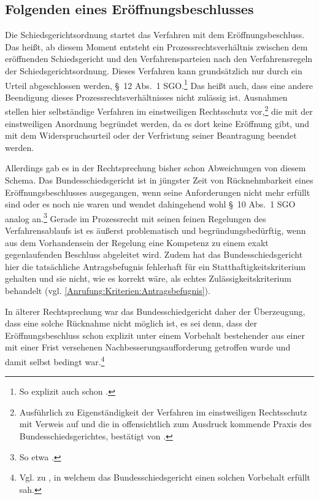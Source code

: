 \subsection{Folgenden eines Eröffnungsbeschlusses}
\label{Anrufung:Beschluss:EroeffnungFolgen}
Die Schiedsgerichtsordnung startet das Verfahren mit dem Eröffnungsbeschluss.
Das heißt, ab diesem Moment entsteht ein Prozessrechtsverhältnis zwischen dem eröffnenden Schiedsgericht und den Verfahrensparteien nach den Verfahrensregeln der Schiedsgerichtsordnung.
Dieses Verfahren kann grundsätzlich nur durch ein Urteil abgeschlossen werden, \S~12 Abs.~1 SGO.\footnote{So explizit auch schon \cite[S.~2]{BSG20131204}.}
Das heißt auch, dass eine andere Beendigung dieses Prozessrechtsverhältnisses nicht zulässig ist.
Ausnahmen stellen hier selbständige Verfahren im einstweiligen Rechtsschutz vor,\footnote{Ausführlich zu Eigenständigkeit der Verfahren im einstweiligen Rechtsschutz \cite[S.~3]{LSGBB145} mit Verweis auf \cites[S.~4]{LSGHE20140423II} und die in \cites{BSG41114ES}{BSG3314EA} offensichtlich zum Ausdruck kommende Praxis des Bundesschiedsgerichtes, bestätigt von \cite[S.~2~f.]{BSG4214ESWiderspruch}.} die mit der einstweiligen Anordnung begründet werden, da es dort keine Eröffnung gibt, und mit dem Widerspruchsurteil oder der Verfristung seiner Beantragung beendet werden.

Allerdings gab es in der Rechtsprechung bisher schon Abweichungen von diesem Schema.
Das Bundesschiedsgericht ist in jüngster Zeit von Rücknehmbarkeit eines Eröffnungsbeschlusses ausgegangen, wenn seine Anforderungen nicht mehr erfüllt sind oder es noch nie waren und wendet dahingehend wohl \S~10 Abs.~1 SGO analog an.\footnote{So etwa \cite{BSGPP100127862}.}
Gerade im Prozessrecht mit seinen feinen Regelungen des Verfahrensablaufs ist es äußerst problematisch und begründungsbedürftig, wenn aus dem Vorhandensein der Regelung eine Kompetenz zu einem exakt gegenlaufenden Beschluss abgeleitet wird.
Zudem hat das Bundesschiedsgericht hier die tatsächliche Antragsbefugnis fehlerhaft für ein Statthaftigkeitskriterium gehalten und sie nicht, wie es korrekt wäre, als echtes Zulässigkeitskriterium behandelt (vgl. \ref{Anrufung:Kriterien:Antragsbefugnis}).

In älterer Rechtsprechung war das Bundesschiedgericht daher der Überzeugung, dass eine solche Rücknahme nicht möglich ist, es sei denn, dass der Eröffnungsbeschluss schon explizit unter einem Vorbehalt bestehender aus einer mit einer Frist versehenen Nachbesserungsaufforderung getroffen wurde und damit selbst bedingt war.\footnote{Vgl. \cite[S.~2]{BSG20130715} zu \cite{LSGNRW2013011}, in welchem das Bundesschiedsgericht einen solchen Vorbehalt erfüllt sah.}

